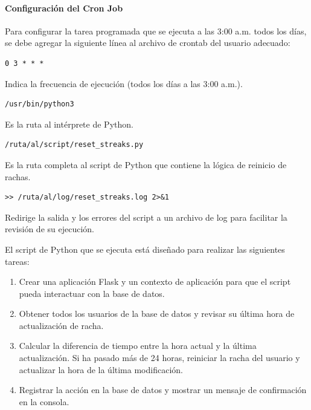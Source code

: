 \paragraph{Configuración del Cron Job}

Para configurar la tarea programada que se ejecuta a las 3:00 a.m. todos los días, se debe agregar la siguiente línea al archivo de crontab del usuario adecuado:


\begin{lstlisting}[caption={Frecuencia de ejecución}, label={lst:cron_frequency}]
0 3 * * *
\end{lstlisting}
\noindent
Indica la frecuencia de ejecución (todos los días a las 3:00 a.m.).

\begin{lstlisting}[caption={Ruta al intérprete de Python}, label={lst:python_path}]
/usr/bin/python3
\end{lstlisting}
\noindent
Es la ruta al intérprete de Python.

\begin{lstlisting}[caption={Ruta al script de Python}, label={lst:script_path}]
/ruta/al/script/reset_streaks.py
\end{lstlisting}
\noindent
Es la ruta completa al script de Python que contiene la lógica de reinicio de rachas.

\begin{lstlisting}[caption={Redirección de salida y errores}, label={lst:log_redirection}]
>> /ruta/al/log/reset_streaks.log 2>&1
\end{lstlisting}
\noindent
Redirige la salida y los errores del script a un archivo de log para facilitar la revisión de su ejecución.

El script de Python que se ejecuta está diseñado para realizar las siguientes tareas:
\begin{enumerate}
    \item Crear una aplicación Flask y un contexto de aplicación para que el script pueda interactuar con la base de datos.
    \item Obtener todos los usuarios de la base de datos y revisar su última hora de actualización de racha.
    \item Calcular la diferencia de tiempo entre la hora actual y la última actualización. Si ha pasado más de 24 horas, reiniciar la racha del usuario y actualizar la hora de la última modificación.
    \item Registrar la acción en la base de datos y mostrar un mensaje de confirmación en la consola.
\end{enumerate}

